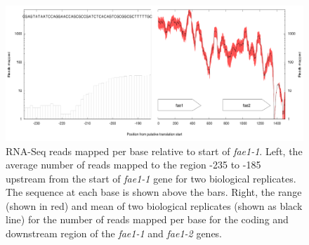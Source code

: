 \begin{figure}[H]
\centering
     \includegraphics[width=1.0\textwidth]{./tex/chapter1/figures/supplemental/FigureS5.png}
     \begin{singlespace}
     \caption[RNA-Seq reads mapped per base relative to start of \textit{fae1-1}.]{
        RNA-Seq reads mapped per base relative to start of \textit{fae1-1}.
        Left, the average number of reads mapped to the region -235 to -185 upstream from the start of \textit{fae1-1} gene for two biological replicates.
        The sequence at each base is shown above the bars.
        Right, the range (shown in red) and mean of two biological replicates (shown as black line) for the number of reads mapped per base for the coding and downstream region
            of the \textit{fae1-1} and \textit{fae1-2} genes.
        }
     \label{fig:S5} %
     \end{singlespace}
\end{figure}


